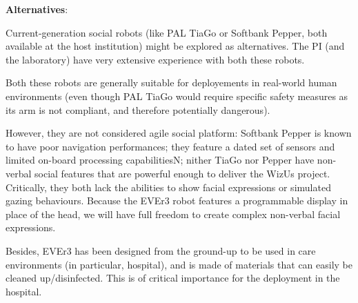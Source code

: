 \textbf{Alternatives}:


Current-generation social robots (like PAL TiaGo or Softbank Pepper, both
available at the host institution) might be
explored as alternatives. The PI (and the laboratory) have very extensive
experience with both these robots.

Both these robots are generally suitable for deployements in real-world human
environments (even though PAL TiaGo would require specific safety measures as
its arm is not compliant, and therefore potentially dangerous).

However, they are not considered agile social platform: Softbank Pepper is known
to have poor navigation performances; they feature a dated set of sensors and
limited on-board processing capabilitiesN; nither TiaGo nor Pepper have
non-verbal social features that are powerful enough to deliver the WizUs
project. Critically, they both lack the abilities to show facial expressions or
simulated gazing behaviours. Because the EVEr3 robot features a programmable
display in place of the head, we will have full freedom to create complex
non-verbal facial expressions.

Besides, EVEr3 has been designed from the ground-up to be used in care
environments (in particular, hospital), and is made of materials that can easily
be cleaned up/disinfected. This is of critical importance for the deployment in
the hospital.



